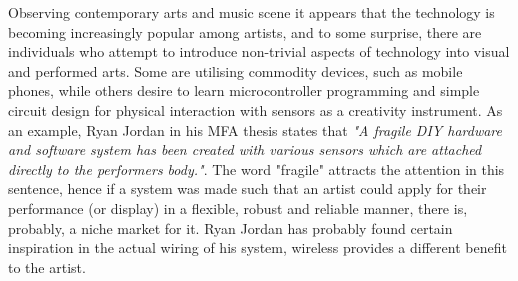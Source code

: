  Observing contemporary arts and music scene it appears that
 the technology is becoming increasingly popular among artists,
 and to some surprise, there are individuals who attempt to
 introduce non-trivial aspects of technology into visual and
 performed arts. Some are utilising commodity devices, such
 as mobile phones, while others desire to learn microcontroller
 programming and simple circuit design for physical interaction
 with sensors as a creativity instrument.
  As an example, Ryan Jordan in his MFA thesis \cite{paper:ryan09}
 states that \emph{"A fragile DIY hardware and software system has
 been created with various sensors which are attached directly to
 the performers body."}. The word "fragile" attracts the attention
 in this sentence, hence if a system was made such that an artist
 could apply for their performance (or display) in a flexible,
 robust and reliable manner, there is, probably, a niche market
 for it. Ryan Jordan has probably found certain inspiration in
 the actual wiring of his system, wireless provides a different
 benefit to the artist.

